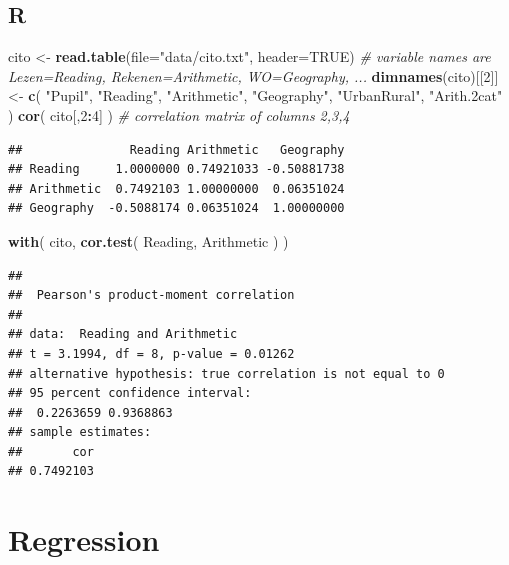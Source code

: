 \documentclass[
]{book}
\newenvironment{Shaded}{\begin{snugshade}}{\end{snugshade}}
\newcommand{\AttributeTok}[1]{\textcolor[rgb]{0.13,0.29,0.53}{#1}}
\newcommand{\CommentTok}[1]{\textcolor[rgb]{0.56,0.35,0.01}{\textit{#1}}}
\newcommand{\ConstantTok}[1]{\textcolor[rgb]{0.56,0.35,0.01}{#1}}
\newcommand{\DecValTok}[1]{\textcolor[rgb]{0.00,0.00,0.81}{#1}}
\newcommand{\FunctionTok}[1]{\textcolor[rgb]{0.13,0.29,0.53}{\textbf{#1}}}
\newcommand{\NormalTok}[1]{#1}
\newcommand{\OtherTok}[1]{\textcolor[rgb]{0.56,0.35,0.01}{#1}}
\newcommand{\SpecialCharTok}[1]{\textcolor[rgb]{0.81,0.36,0.00}{\textbf{#1}}}
\newcommand{\StringTok}[1]{\textcolor[rgb]{0.31,0.60,0.02}{#1}}
\begin{document}
\hypertarget{r-7}{%
\subsection{R}\label{r-7}}

\begin{Shaded}
\begin{Highlighting}[]
\NormalTok{cito }\OtherTok{\textless{}{-}} \FunctionTok{read.table}\NormalTok{(}\AttributeTok{file=}\StringTok{"data/cito.txt"}\NormalTok{, }\AttributeTok{header=}\ConstantTok{TRUE}\NormalTok{)}
\CommentTok{\# variable names are Lezen=Reading, Rekenen=Arithmetic, WO=Geography, ...}
\FunctionTok{dimnames}\NormalTok{(cito)[[}\DecValTok{2}\NormalTok{]] }\OtherTok{\textless{}{-}} \FunctionTok{c}\NormalTok{( }\StringTok{"Pupil"}\NormalTok{, }\StringTok{"Reading"}\NormalTok{, }\StringTok{"Arithmetic"}\NormalTok{, }\StringTok{"Geography"}\NormalTok{,}
                          \StringTok{"UrbanRural"}\NormalTok{, }\StringTok{"Arith.2cat"}\NormalTok{ )}
\FunctionTok{cor}\NormalTok{( cito[,}\DecValTok{2}\SpecialCharTok{:}\DecValTok{4}\NormalTok{] ) }\CommentTok{\# correlation matrix of columns 2,3,4}
\end{Highlighting}
\end{Shaded}

\begin{verbatim}
##               Reading Arithmetic   Geography
## Reading     1.0000000 0.74921033 -0.50881738
## Arithmetic  0.7492103 1.00000000  0.06351024
## Geography  -0.5088174 0.06351024  1.00000000
\end{verbatim}

\begin{Shaded}
\begin{Highlighting}[]
\FunctionTok{with}\NormalTok{( cito, }\FunctionTok{cor.test}\NormalTok{( Reading, Arithmetic ) )}
\end{Highlighting}
\end{Shaded}

\begin{verbatim}
## 
##  Pearson's product-moment correlation
## 
## data:  Reading and Arithmetic
## t = 3.1994, df = 8, p-value = 0.01262
## alternative hypothesis: true correlation is not equal to 0
## 95 percent confidence interval:
##  0.2263659 0.9368863
## sample estimates:
##       cor 
## 0.7492103
\end{verbatim}

\hypertarget{sec:regression}{%
\section{Regression}\label{sec:regression}}
\end{document}
